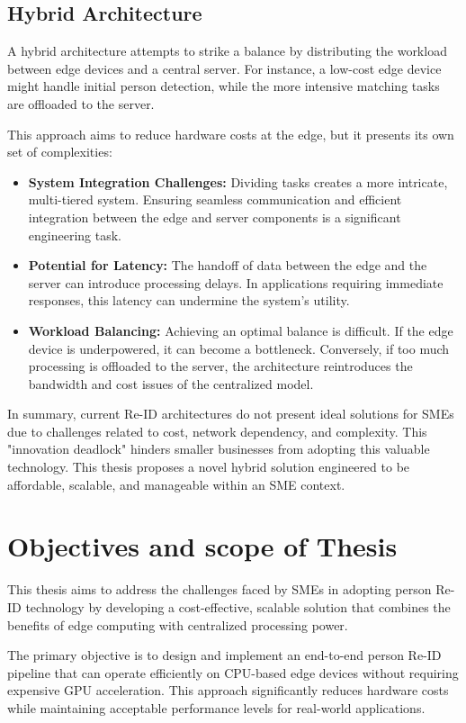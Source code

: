 \documentclass[../main.tex]{subfiles}
\begin{document}
\subsection{Hybrid Architecture}
A hybrid architecture attempts to strike a balance by distributing the workload between edge devices and a central server. For instance, a low-cost edge device might handle initial person detection, while the more intensive matching tasks are offloaded to the server.

This approach aims to reduce hardware costs at the edge, but it presents its own set of complexities:
\begin{itemize}
    \item \textbf{System Integration Challenges:} Dividing tasks creates a more intricate, multi-tiered system. Ensuring seamless communication and efficient integration between the edge and server components is a significant engineering task.
    \item \textbf{Potential for Latency:} The handoff of data between the edge and the server can introduce processing delays. In applications requiring immediate responses, this latency can undermine the system's utility.
    \item \textbf{Workload Balancing:} Achieving an optimal balance is difficult. If the edge device is underpowered, it can become a bottleneck. Conversely, if too much processing is offloaded to the server, the architecture reintroduces the bandwidth and cost issues of the centralized model.
\end{itemize}
In summary, current Re-ID architectures do not present ideal solutions for SMEs due to challenges related to cost, network dependency, and complexity. This "innovation deadlock" hinders smaller businesses from adopting this valuable technology. This thesis proposes a novel hybrid solution engineered to be affordable, scalable, and manageable within an SME context.

\section{Objectives and scope of Thesis} 
\label{sec:objectives}

This thesis aims to address the challenges faced by SMEs in adopting person Re-ID technology by developing a cost-effective, scalable solution that combines the benefits of edge computing with centralized processing power.

The primary objective is to design and implement an end-to-end person Re-ID pipeline that can operate efficiently on CPU-based edge devices without requiring expensive GPU acceleration. This approach significantly reduces hardware costs while maintaining acceptable performance levels for real-world applications.
\end{document}
